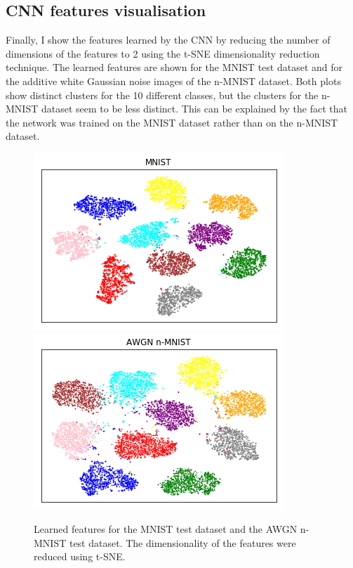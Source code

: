 \documentclass{article}
\begin{document}
\subsection{CNN features visualisation}
Finally, I show the features learned by the CNN by reducing the number of dimensions of the features to 2 using the t-SNE \cite{maaten2008visualizing} dimensionality reduction technique. The learned features are shown for the MNIST test dataset and for the additive white Gaussian noise images of the n-MNIST dataset. Both plots show distinct clusters for the 10 different classes, but the clusters for the n-MNIST dataset seem to be less distinct. This can be explained by the fact that the network was trained on the MNIST dataset rather than on the n-MNIST dataset.

\begin{figure}
	\centering
	\includegraphics[scale=0.38]{embeddings_visualisation.png}
	\includegraphics[scale=0.38]{noisy_embeddings_visualisation}
	\caption{Learned features for the MNIST test dataset and the AWGN n-MNIST test dataset. The dimensionality of the features were reduced using t-SNE.}
\end{figure}
\end{document}
